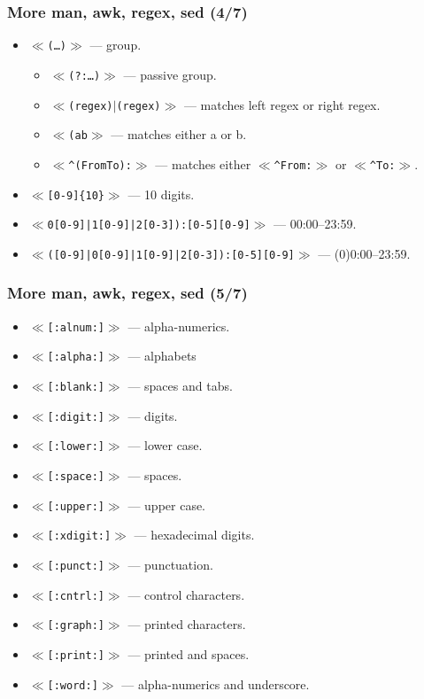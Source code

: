 \documentclass[aspectratio=169, xcolor=table, notheorems, hyperref={pdfpagelabels=false}]{beamer}
\begin{document}
\begin{frame}[fragile]
\frametitle{More man, awk, regex, sed (4/7)}
\begin{itemize}
\item $\ll$\texttt{(\ldots)}$\gg$ --- group.
\begin{itemize}
\item $\ll$\texttt{(?:\ldots)}$\gg$ --- passive group.
\item $\ll$\texttt{(regex)$\mid$(regex)}$\gg$ --- matches left regex or right regex.
\item $\ll$\texttt{(a\textbar{}b}$\gg$ --- matches either a or b.
\item $\ll$\texttt{\^{}(From\textbar{}To):}$\gg$ --- matches either $\ll$\texttt{\^{}From:}$\gg$ or
      $\ll$\texttt{\^{}To:}$\gg$.
\end{itemize}
\item $\ll$\texttt{[0-9]\{10\}}$\gg$ --- 10 digits.
\item $\ll$\texttt{0[0-9]|1[0-9]|2[0-3]):[0-5][0-9]}$\gg$ --- 00:00--23:59.
\item $\ll$\texttt{([0-9]|0[0-9]|1[0-9]|2[0-3]):[0-5][0-9]}$\gg$ --- (0)0:00--23:59.
\end{itemize}
\end{frame}


\begin{frame}[fragile]
\frametitle{More man, awk, regex, sed (5/7)}
\begin{itemize}
\item $\ll$\texttt{[:alnum:]}$\gg$ --- alpha-numerics.
\item $\ll$\texttt{[:alpha:]}$\gg$ --- alphabets
\item $\ll$\texttt{[:blank:]}$\gg$ --- spaces and tabs.
\item $\ll$\texttt{[:digit:]}$\gg$ --- digits.
\item $\ll$\texttt{[:lower:]}$\gg$ --- lower case.
\item $\ll$\texttt{[:space:]}$\gg$ --- spaces.
\item $\ll$\texttt{[:upper:]}$\gg$ --- upper case.
\item $\ll$\texttt{[:xdigit:]}$\gg$ --- hexadecimal digits.
\item $\ll$\texttt{[:punct:]}$\gg$ --- punctuation.
\item $\ll$\texttt{[:cntrl:]}$\gg$ --- control characters.
\item $\ll$\texttt{[:graph:]}$\gg$ --- printed characters.
\item $\ll$\texttt{[:print:]}$\gg$ --- printed and spaces.
\item $\ll$\texttt{[:word:]}$\gg$ --- alpha-numerics and underscore.
\end{itemize}
\end{frame}
\end{document}
